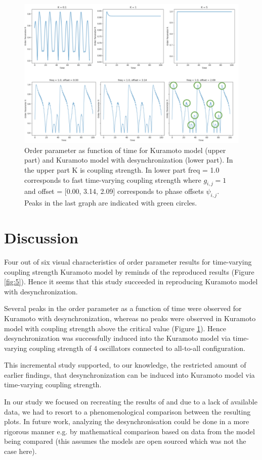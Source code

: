 \documentclass{article}
\begin{document}
\begin{figure}[H]
    \centering
    \includegraphics[width=12cm]{Proj_fig6.png}
    \caption{Order parameter as function of time for Kuramoto model (upper part) and Kuramoto model with desynchronization (lower part). In the upper part K is coupling strength. In lower part freq = 1.0 corresponds to fast time-varying coupling strength where \( g_{i,j} = 1\) and offset = [0.00, 3.14, 2.09] corresponds to phase offsets  \( \psi_{i,j} \). Peaks in the last graph are indicated with green circles.}
    \label{fig:6}
\end{figure}

\section{Discussion}
Four out of six visual characteristics of order parameter results for time-varying coupling strength Kuramoto model by \cite{Cumin} reminds of the reproduced results (Figure \ref{fig:5}). Hence it seems that this study succeeded in reproducing Kuramoto model with desynchronization.

Several peaks in the order parameter as a function of time were observed for Kuramoto with desynchronization, whereas no peaks were observed in Kuramoto model with coupling strength above the critical value (Figure \ref{fig:6}). Hence desynchronization was successfully induced into the Kuramoto model via time-varying coupling strength of 4 oscillators connected to all-to-all configuration.

This incremental study supported, to our knowledge, the restricted amount of earlier findings, that desynchronization can be induced into Kuramoto model via time-varying coupling strength. 

In our study we focused on recreating the results of \cite{Cumin} and due to a lack of available data, we had to resort to a phenomenological comparison between the resulting plots. In future work, analyzing the desynchronisation could be done in a more rigorous manner e.g. by mathematical comparison based on data from the model being compared (this assumes the models are open sourced which was not the case here).
\end{document}
